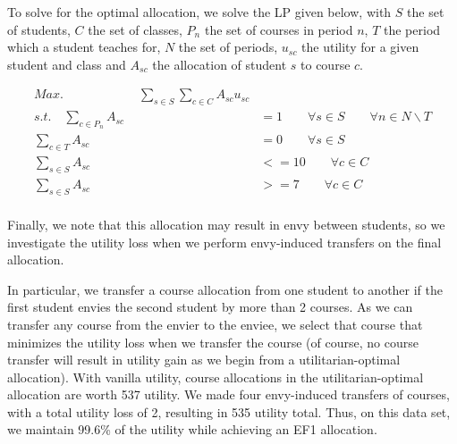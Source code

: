 To solve for the optimal allocation, we solve the LP given below, with $S$ the set of students, $C$ the set of classes, $P_n$ the set of courses in period $n$, $T$ the period which a student teaches for, $N$ the set of periods, $u_{sc}$ the utility for a given student and class and $A_{sc}$ the allocation of student $s$ to course $c$.  


\begin{align*}
    Max. \quad \quad \quad \quad \quad \quad \sum_{s\in S} \sum_{c \in C} A_{sc}u_{sc} \\
    s.t. \quad \sum_{c\in P_n} A_{sc} &= 1 \qquad \forall s \in S \qquad \forall n \in N \backslash T\\ 
    \sum_{c\in T} A_{sc} &= 0 \qquad \forall s \in S\\ 
    \sum_{s\in S} A_{sc} &<= 10 \qquad \forall c \in C\\
    \sum_{s\in S} A_{sc} &>= 7 \qquad \forall c \in C\\
\end{align*}

Finally, we note that this allocation may result in envy between students, so we investigate the utility loss when we perform envy-induced transfers on the final allocation.  

In particular, we transfer a course allocation from one student to another if the first student envies the second student by more than 2 courses.  As we can transfer any course from the envier to the enviee, we select that course that minimizes the utility loss when we transfer the course (of course, no course transfer will result in utility gain as we begin from a utilitarian-optimal allocation).  With vanilla utility, course allocations in the utilitarian-optimal allocation are worth 537 utility.  We made four envy-induced transfers of courses, with a total utility loss of 2, resulting in 535 utility total.  Thus, on this data set, we maintain 99.6\% of the utility while achieving an EF1 allocation.  